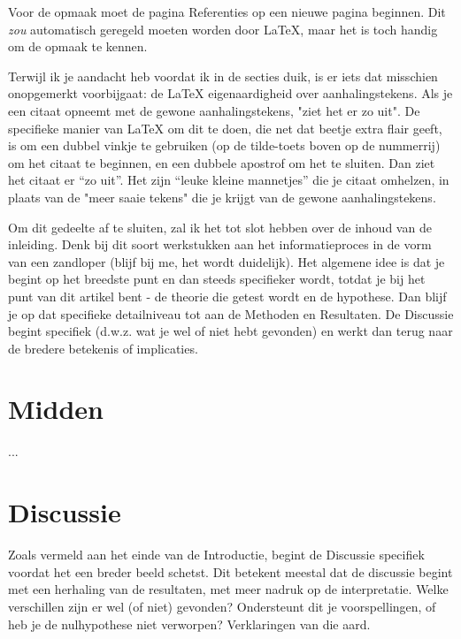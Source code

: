 \documentclass[stu,12pt,floatsintext]{apa7}
\begin{document}
Voor de opmaak moet de pagina Referenties op een nieuwe pagina beginnen. Dit \textit{zou} automatisch geregeld moeten worden door \LaTeX{}, maar het is toch handig om de opmaak te kennen.

Terwijl ik je aandacht heb voordat ik in de secties duik, is er iets dat misschien onopgemerkt voorbijgaat: de \LaTeX{} eigenaardigheid over aanhalingstekens. 
Als je een citaat opneemt met de gewone aanhalingstekens, "ziet het er zo uit". 
De specifieke manier van \LaTeX{} om dit te doen, die net dat beetje extra flair geeft, is om een dubbel vinkje te gebruiken (op de tilde-toets boven op de nummerrij) om het citaat te beginnen, en een dubbele apostrof om het te sluiten. Dan ziet het citaat er ``zo uit''. 
Het zijn ``leuke kleine mannetjes'' die je citaat omhelzen, in plaats van de "meer saaie tekens" die je krijgt van de gewone aanhalingstekens.

Om dit gedeelte af te sluiten, zal ik het tot slot hebben over de inhoud van de inleiding. Denk bij dit soort werkstukken aan het informatieproces in de vorm van een zandloper (blijf bij me, het wordt duidelijk). Het algemene idee is dat je begint op het breedste punt en dan steeds specifieker wordt, totdat je bij het punt van dit artikel bent - de theorie die getest wordt en de hypothese. 
Dan blijf je op dat specifieke detailniveau tot aan de Methoden en Resultaten. 
De Discussie begint specifiek (d.w.z. wat je wel of niet hebt gevonden) en werkt dan terug naar de bredere betekenis of implicaties.

\section{Midden}

...

\section{Discussie}

Zoals vermeld aan het einde van de Introductie, begint de Discussie specifiek voordat het een breder beeld schetst. Dit betekent meestal dat de discussie begint met een herhaling van de resultaten, met meer nadruk op de interpretatie. Welke verschillen zijn er wel (of niet) gevonden? Ondersteunt dit je voorspellingen, of heb je de nulhypothese niet verworpen? Verklaringen van die aard.
\end{document}
